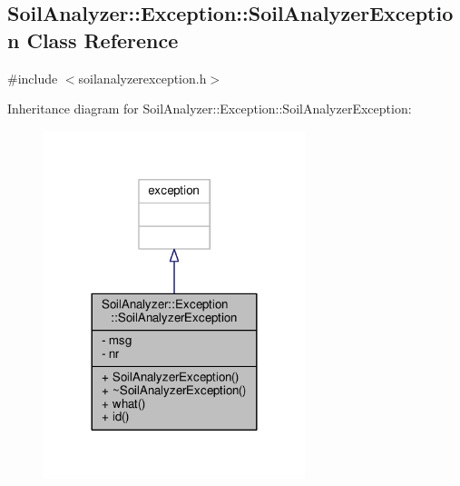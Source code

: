\hypertarget{class_soil_analyzer_1_1_exception_1_1_soil_analyzer_exception}{}\subsection{Soil\+Analyzer\+:\+:Exception\+:\+:Soil\+Analyzer\+Exception Class Reference}
\label{class_soil_analyzer_1_1_exception_1_1_soil_analyzer_exception}


{\ttfamily \#include $<$soilanalyzerexception.\+h$>$}



Inheritance diagram for Soil\+Analyzer\+:\+:Exception\+:\+:Soil\+Analyzer\+Exception\+:
\nopagebreak
\begin{figure}[H]
\begin{center}
\leavevmode
\includegraphics[width=216pt]{class_soil_analyzer_1_1_exception_1_1_soil_analyzer_exception__inherit__graph}
\end{center}
\end{figure}


